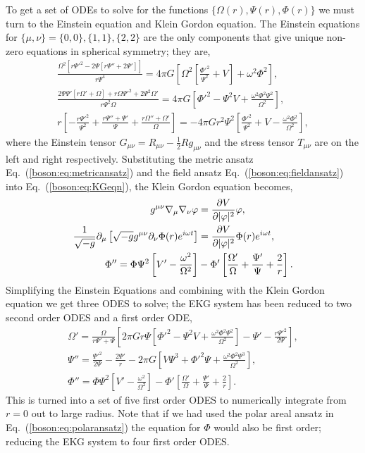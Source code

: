 To get a set of ODEs to solve for the functions $\{\Omega(r), \Psi(r),\Phi(r)\}$ we must turn to the Einstein equation and Klein Gordon equation. The Einstein equations for $\{\mu,\nu\}=\{0,0\},\{1,1\},\{2,2\}$ are the only components that give unique non-zero equations in spherical symmetry; they are,
\begin{gather}
\frac{\Omega ^2 \left[r \Psi '^2-2 \Psi  \left[r \Psi ''+2 \Psi '\right]\right]}{r \Psi ^4} = 4\pi G \left[\Omega ^2 \left[\frac{\Phi'^2}{\Psi ^2}+V\right]+\omega ^2 \Phi^2\right],\\
\frac{2 \Psi  \Psi ' \left[r \Omega '+\Omega \right]+r \Omega  \Psi '^2+2 \Psi ^2 \Omega
   '}{r \Psi ^2 \Omega } = 4\pi G \left[\Phi'^2-\Psi ^2 V+\frac{\omega ^2 \Phi^2 \Psi ^2}{\Omega
   ^2}\right],\\
   r \left[-\frac{r \Psi '^2}{\Psi ^2}+\frac{r \Psi ''+\Psi '}{\Psi }+\frac{r \Omega ''+\Omega
   '}{\Omega }\right] = -4\pi G r^2 \Psi ^2 \left[\frac{\Phi'^2}{\Psi ^2}+V-\frac{\omega ^2 \Phi^2}{\Omega
   ^2}\right],
   \end{gather}
  where the Einstein tensor $G_{\mu\nu} = R_{\mu\nu}-\frac{1}{2}R g_{\mu\nu}$  and the stress tensor $T_{\mu\nu}$ are on the left and right respectively. Substituting the metric ansatz Eq.~(\ref{boson:eq:metricansatz}) and the field ansatz Eq.~(\ref{boson:eq:fieldansatz}) into Eq.~(\ref{boson:eq:KGeqn}), the Klein Gordon equation becomes,
  \begin{align}
  g^{\mu\nu}\nabla_\mu\nabla_\nu \varphi &= \frac{\partial V}{\partial |\varphi|^2}\varphi ,\\
   \frac{1}{\sqrt{-g}}\partial_\mu \left[ \sqrt{-g}g^{\mu\nu}\partial_\nu \Phi(r)e^{i\omega t}\right] &= \frac{\partial V}{\partial |\varphi|^2} \Phi(r)e^{i\omega t} ,\\
  \Phi'' = \Phi\Psi^2\left[V'-\frac{\omega^2}{\Omega^2}\right] &- \Phi'\left[\frac{\Omega'}{\Omega} +\frac{\Psi'}{\Psi}+\frac{2}{r} \right].
  \end{align}
Simplifying the Einstein Equations and combining with the Klein Gordon equation we get three ODES to solve; the EKG system has been reduced to two second order ODES and a first order ODE,
\begin{gather}
\Omega '=\frac{\Omega}{r\Psi'+\Psi}\left[2 \pi  G r \Psi \left[\Phi'^2 -\Psi^2 
   V+\frac{\omega ^2 \Phi^2 \Psi^2}{\Omega^2} \right]  -\Psi '-\frac{r \Psi '^2}{2 \Psi} \right] \label{boson:eq:EKGODE1}
,\\{ \Psi'' = \frac{\Psi'^2}{2\Psi} - \frac{2\Psi'}{r}-2\pi G \left[V \Psi^3 + \Phi'^2\Psi+ \frac{ \omega^2\Phi^2\Psi^3}{\Omega^2}\right] } \label{boson:eq:EKGODE2}
,\\ \Phi'' = \Phi\Psi^2\left[V'-\frac{\omega^2}{\Omega^2}\right] - \Phi'\left[\frac{\Omega'}{\Omega} +\frac{\Psi'}{\Psi}+\frac{2}{r} \right]. \label{boson:eq:EKGODE3}
\end{gather}
This is turned into a set of five first order ODES to numerically integrate from $r=0$ out to large radius. Note that if we had used the polar areal ansatz in Eq.~(\ref{boson:eq:polaransatz}) the equation for $\Phi$ would also be first order; reducing the EKG system to four first order ODES.

